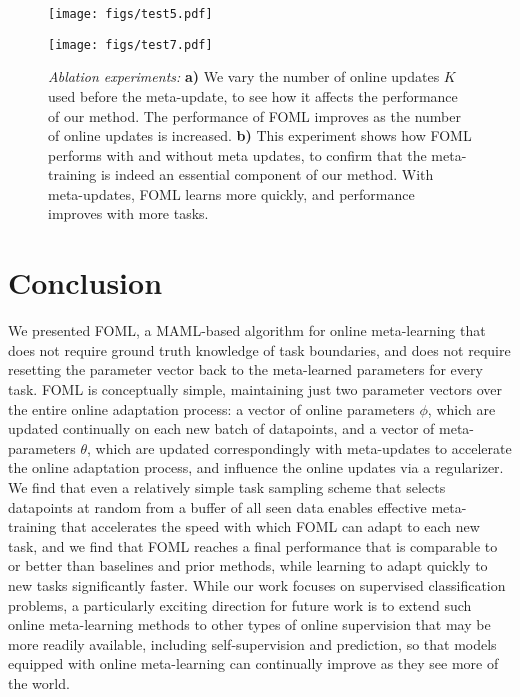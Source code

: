 \begin{figure}[!t]
    \centering
    \begin{minipage}[]{0.45\textwidth}
        \texttt{[image: figs/test5.pdf]}
    \end{minipage}
    \begin{minipage}[]{0.45\textwidth}
        \texttt{[image: figs/test7.pdf]}
    \end{minipage}
    \caption{\footnotesize{\emph{Ablation experiments:} \textbf{a)} We vary the number of online updates $K$ used before the meta-update, to see how it affects the performance of our method. The performance of FOML improves as the number of online updates is increased. \textbf{b)} This experiment shows how FOML performs with and without meta updates, to confirm that the meta-training is indeed an essential component of our method. With meta-updates, FOML learns more quickly, and performance improves with more tasks.}}
    \label{fig:ablations}
\end{figure}



\vspace{-0.4cm}
\section{Conclusion}
\vspace{-0.4cm}
We presented FOML, a MAML-based algorithm for online meta-learning that does not require ground truth knowledge of task boundaries, and does not require resetting the parameter vector back to the meta-learned parameters for every task. FOML is conceptually simple, maintaining just two parameter vectors over the entire online adaptation process: a vector of online parameters $\phi$, which are updated continually on each new batch of datapoints, and a vector of meta-parameters $\theta$, which are updated correspondingly with meta-updates to accelerate the online adaptation process, and influence the online updates via a regularizer. We find that even a relatively simple task sampling scheme that selects datapoints at random from a buffer of all seen data enables effective meta-training that accelerates the speed with which FOML can adapt to each new task, and we find that FOML reaches a final performance that is comparable to or better than baselines and prior methods, while learning to adapt quickly to new tasks significantly faster. While our work focuses on supervised classification problems, a particularly exciting direction for future work is to extend such online meta-learning methods to other types of online supervision that may be more readily available, including self-supervision and prediction, so that models equipped with online meta-learning can continually improve as they see more of the world.
